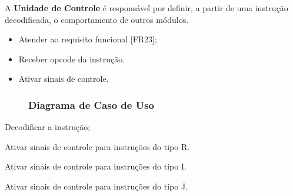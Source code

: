  
    A \textbf{Unidade de Controle} é responsável por definir, a partir de uma instrução decodificada, o comportamento de outros módulos.
  
  \actors
    \begin{description}
    \end{description}
  
  \preconditions 
    \begin{itemize}
     \item Atender ao requisito funcional [FR23];
     \item Receber opcode da instrução.
    \end{itemize}

  \postconditions
    \begin{itemize}
      \item Ativar sinais de controle.
    \end{itemize}
  
\begin{landscape} 
    \begin{figure}
  \subsubsection*{Diagrama de Caso de Uso}
  	
  	\end{figure}
\end{landscape}
 
  
  \begin{mainflow}
    \item Decodificar a instrução;
  \end{mainflow}
  
  \begin{secondaryflow} 
     \item Ativar sinais de controle para instruções do tipo R.
     \item Ativar sinais de controle para instruções do tipo I.
     \item Ativar sinais de controle para instruções do tipo J.
 \end{secondaryflow}